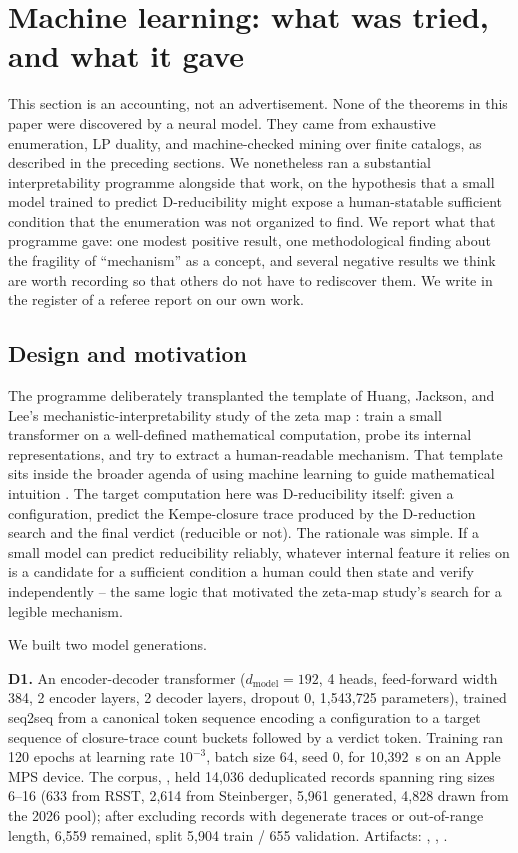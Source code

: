 \section{Machine learning: what was tried, and what it gave}
\label{sec:ml}

This section is an accounting, not an advertisement. None of the theorems in
this paper were discovered by a neural model. They came from exhaustive
enumeration, LP duality, and machine-checked mining over finite catalogs, as
described in the preceding sections. We nonetheless ran a substantial
interpretability programme alongside that work, on the hypothesis that a
small model trained to predict D-reducibility might expose a human-statable
sufficient condition that the enumeration was not organized to find. We
report what that programme gave: one modest positive result, one
methodological finding about the fragility of ``mechanism'' as a concept,
and several negative results we think are worth recording so that others do
not have to rediscover them. We write in the register of a referee report
on our own work.

\subsection{Design and motivation}

The programme deliberately transplanted the template of
Huang, Jackson, and Lee's mechanistic-interpretability study of the zeta
map \cite{huang2025zeta}: train a small transformer on a well-defined
mathematical computation, probe its internal representations, and try to
extract a human-readable mechanism. That template sits inside the broader
agenda of using machine learning to guide mathematical intuition
\cite{davies2021}. The target computation here was D-reducibility itself:
given a configuration, predict the Kempe-closure trace produced by the
D-reduction search and the final verdict (reducible or not). The rationale
was simple. If a small model can predict reducibility reliably, whatever
internal feature it relies on is a candidate for a sufficient condition a
human could then state and verify independently -- the same logic that
motivated the zeta-map study's search for a legible mechanism.

We built two model generations.

\textbf{D1.} An encoder-decoder transformer ($d_{\mathrm{model}}=192$,
4 heads, feed-forward width 384, 2 encoder layers, 2 decoder layers,
dropout 0, 1{,}543{,}725 parameters), trained seq2seq from a canonical
token sequence encoding a configuration to a target sequence of
closure-trace count buckets followed by a verdict token. Training ran 120
epochs at learning rate $10^{-3}$, batch size 64, seed 0, for 10{,}392~s on
an Apple MPS device. The corpus, , held
14{,}036 deduplicated records spanning ring sizes 6--16 (633 from RSST,
2{,}614 from Steinberger, 5{,}961 generated, 4{,}828 drawn from the 2026
pool); after excluding records with degenerate traces or out-of-range
length, 6{,}559 remained, split 5{,}904 train / 655 validation. Artifacts:
,
,
.

